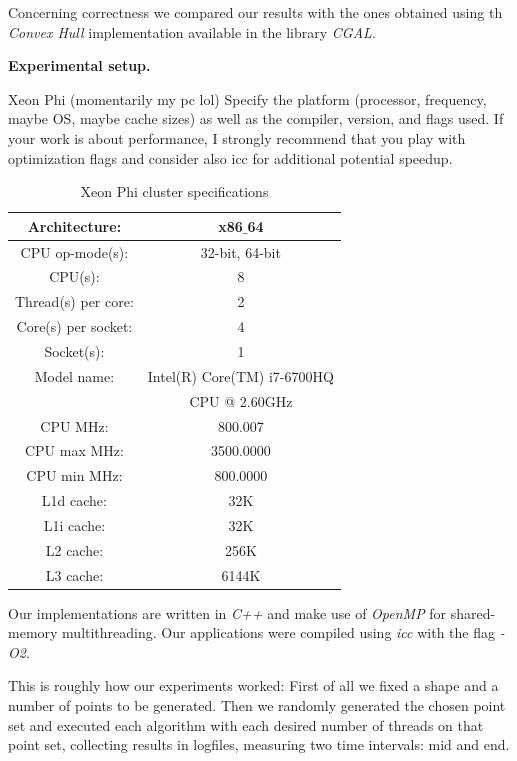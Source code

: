 \documentclass[letterpaper]{article}
\newcommand{\mypar}[1]{{\bf #1.}}
\begin{document}
Concerning correctness we compared our results with the ones obtained using th \textit{Convex Hull} implementation available in the library \textit{CGAL}.

\mypar{Experimental setup}

Xeon Phi (momentarily my pc lol)
 Specify the platform (processor, frequency, maybe OS, maybe cache sizes)
as well as the compiler, version, and flags used. If your work is about performance, 
I strongly recommend that you play with optimization flags and consider also icc for additional potential speedup.
\begin{table}[!ht]
\begin{tabular}{|c|c|}
\hline Architecture: 		 & x86$\_$64\\
\hline CPU op-mode(s):        & 32-bit, 64-bit\\
\hline CPU(s):                & 8\\
\hline Thread(s) per core:    & 2\\
\hline Core(s) per socket:    & 4\\
\hline Socket(s):             & 1\\
\hline Model name:            & Intel(R) Core(TM) i7-6700HQ\\							 & CPU @ 2.60GHz\\
\hline CPU MHz:               & 800.007\\
\hline CPU max MHz:           & 3500.0000\\
\hline CPU min MHz:           & 800.0000\\
\hline L1d cache:             & 32K\\
\hline L1i cache:             & 32K\\
\hline L2 cache:              & 256K\\
\hline L3 cache:              & 6144K\\
\hline
\end{tabular}
\caption{Xeon Phi cluster specifications}
\end{table}

Our implementations are written in \textit{C++} and make use of \textit{OpenMP} for shared-memory multithreading.
Our applications were compiled using \textit{icc} with the flag \textit{-O2}.

This is roughly how our experiments worked:
First of all we fixed a shape and a number of points to be generated. Then we randomly generated the chosen point set and executed each algorithm with each desired number of threads on that point set, collecting results in logfiles, measuring two time intervals: mid and end.
\end{document}

